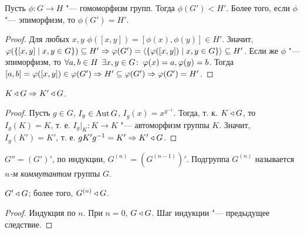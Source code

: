 \documentclass[main]{subfiles}
\begin{document}
\begin{proposition}
  Пусть \( \phi : G \to H \) "--- гомоморфизм групп.
  Тогда \( \phi(G') < H' \).
  Более того, если \( \phi \) "--- эпиморфизм,
  то \( \phi(G') = H' \).
\end{proposition}
\begin{proof}
  Для любых \( x, y \)
  \( \phi([x, y]) = [\phi(x), \phi(y)] \in H' \).
  Значит, \( \varphi(\{ [x,y] \mid x, y \in G \}) \subseteq H' \Rightarrow
  \varphi(G') = \langle \{ \varphi([x, y]) \mid x, y \in G \} \rangle
  \subseteq H' \).
  Если же \( \phi \) "--- эпиморфизм, то
  \( \forall {a, b \in H} \; \, \exists x, y \in G \colon \:
  \varphi(x) = a, \varphi(y) = b \).
  Тогда \( [a, b] = \varphi([x, y]) \in \varphi(G') \Rightarrow
  H' \subseteq \varphi(G') \Rightarrow \varphi(G') = H' \).
\end{proof}

\begin{corollary}
  \( K \triangleleft G \Rightarrow K' \triangleleft G \).
\end{corollary}
\begin{proof}
  Пусть \( g \in G \), \( I_g \in \operatorname{Aut} G \),
  \( I_g(x) = x^{g^{-1}} \).
  Тогда, т. к. \( K \triangleleft G \),
  то \( I_g(K) = K \), т. е.
  \( I_g \bigr|_K : K \to K \) "---
  автоморфизм группы \( K \).
  Значит, \( I_g(K') = K' \), т. е.
  \( g K' g^{-1} = K' \Rightarrow K' \triangleleft G \).
\end{proof}

\begin{definition}
  \( G'' = (G')' \), по индукции,
  \( G^{(n)} = (G^{(n-1)})' \).
  Подгруппа \( G^{(n)} \) называется
  \emph{\(n\)-м коммутантом} группы \( G \).
\end{definition}

\begin{corollary}
  \( G' \triangleleft G \); более того, \( G^{(n)} \triangleleft G \).
\end{corollary}
\begin{proof}
  Индукция по \( n \). При \( n = 0 \),
  \( G \triangleleft G \). Шаг индукции "---
  предыдущее следствие.
\end{proof}
\end{document}
